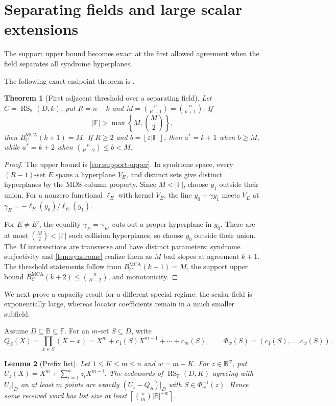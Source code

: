 \documentclass[11pt,a4paper]{amsart}
\numberwithin{equation}{section}
\newtheorem{theorem}{Theorem}[section]
\newtheorem{lemma}[theorem]{Lemma}
\theoremstyle{remark}
\DeclareMathOperator{\RS}{RS}
\DeclareMathOperator{\MCA}{MCA}
\newcommand{\F}{\mathbb F}
\newcommand{\B}{\mathbb B}
\newcommand{\eps}{\varepsilon}
\newcommand{\abs}[1]{\lvert#1\rvert}
\newcommand{\floor}[1]{\left\lfloor#1\right\rfloor}
\newcommand{\ceil}[1]{\left\lceil#1\right\rceil}
\begin{document}
\section{Separating fields and large scalar extensions}

The support upper bound becomes exact at the first allowed agreement when the field separates all syndrome hyperplanes.

The following exact endpoint theorem is \cite[Theorem ``Exact first adjacent row over a separating field'']{ChoGF26}.

\begin{theorem}[First adjacent threshold over a separating field]\label{thm:separating}
Let $C=\RS_{\F}(D,k)$, put $R=n-k$ and $M=\binom n{R-1}=\binom n{k+1}$.  If
\[
 \abs\F>\max\left\{M,\binom M2\right\},
\]
then $B_C^{\MCA}(k+1)=M$.  If $R\ge2$ and $b=\floor{\eps\abs\F}$, then $a^*=k+1$ when $b\ge M$, while $a^*=k+2$ when $\binom n{R-2}\le b<M$.
\end{theorem}

\begin{proof}
The upper bound is \cref{cor:support-upper}.  In syndrome space, every $(R-1)$-set $E$ spans a hyperplane $V_E$, and distinct sets give distinct hyperplanes by the MDS column property.  Since $M<\abs\F$, choose $y_1$ outside their union.  For a nonzero functional $\ell_E$ with kernel $V_E$, the line $y_0+\gamma y_1$ meets $V_E$ at $\gamma_E=-\ell_E(y_0)/\ell_E(y_1)$.

For $E\ne E'$, the equality $\gamma_E=\gamma_{E'}$ cuts out a proper hyperplane in $y_0$.  There are at most $\binom M2<\abs\F$ such collision hyperplanes, so choose $y_0$ outside their union.  The $M$ intersections are transverse and have distinct parameters; syndrome surjectivity and \cref{lem:syndrome} realize them as $M$ bad slopes at agreement $k+1$.  The threshold statements follow from $B_C^{\MCA}(k+1)=M$, the support upper bound $B_C^{\MCA}(k+2)\le\binom n{R-2}$, and monotonicity.
\end{proof}

We next prove a capacity result for a different special regime: the scalar field is exponentially large, whereas locator coefficients remain in a much smaller subfield.

Assume $D\subseteq\B\subseteq\F$.  For an $m$-set $S\subseteq D$, write
\[
 Q_S(X)=\prod_{x\in S}(X-x)=X^m+c_1(S)X^{m-1}+\cdots+c_m(S),
 \qquad \Phi_w(S)=(c_1(S),\ldots,c_w(S)).
\]

\begin{lemma}[Prefix list]\label{lem:prefix}
Let $1\le K\le m\le n$ and $w=m-K$.  For $z\in\B^w$, put $U_z(X)=X^m+\sum_{i=1}^wz_iX^{m-i}$.  The codewords of $\RS_{\F}(D,K)$ agreeing with $U_z|_D$ on at least $m$ points are exactly $(U_z-Q_S)|_D$ with $S\in\Phi_w^{-1}(z)$.  Hence some received word has list size at least $\ceil{\binom nm\abs\B^{-w}}$.
\end{lemma}
\end{document}
